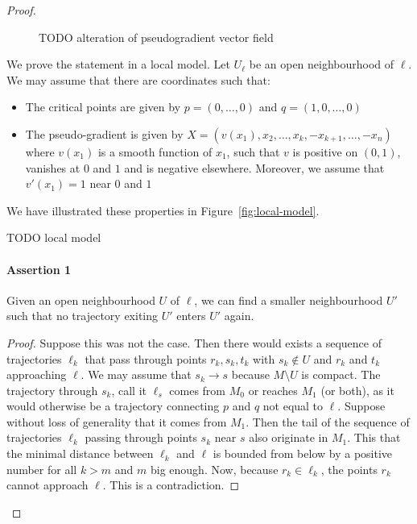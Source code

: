 \begin{proof}
\begin{figure}[H]
    \centering
    \caption{TODO alteration of pseudogradient vector field}
    \label{fig:alteration-of-pseudogradient-vector-field}
\end{figure}

We prove the statement in a local model.
Let $U_\ell$ be an open neighbourhood of $\ell$. 
We may assume that there are coordinates such that:
\begin{itemize}
    \item  The critical points are given by $p = (0, \ldots, 0)$ and $q = (1, 0, \ldots, 0)$
    \item The pseudo-gradient is given by $X = (v(x_1), x_2, \ldots, x_k, -x_{k+1}, \ldots, -x_n)$ where $v(x_1)$ is a smooth function of $x_1$, such that  $v$ is positive on  $(0, 1)$, vanishes at $0$ and $1$ and is negative elsewhere.
        Moreover, we assume that  $v'(x_1) = 1$ near $0$ and $1$
\end{itemize}
We have illustrated these properties in Figure~\ref{fig:local-model}.
\begin{marginfigure}
    \centering
    \caption{TODO local model}
    \label{fig:local-model}
\end{marginfigure}

\renewcommand{\qedsymbol}{\ensuremath{\blacksquare}}

\paragraph{Assertion 1}
Given an open neighbourhood $U$ of  $ \ell$, we can find a smaller neighbourhood $U'$ such that no trajectory exiting $U'$ enters $U'$ again.
\begin{proof}
    Suppose this was not the case.
    Then there would exists a sequence of trajectories $\ell_k$ that pass through points $r_k, s_k, t_k$ with $s_k \not\in U$ and $r_k$ and $t_k$ approaching $\ell$.
    We may assume that $s_k \to s$ because $M \setminus U$ is compact.
    The trajectory through $s_k$, call it $ \ell_s$ comes from  $ M_0$ or reaches $ M_1$ (or both), as it would otherwise be a trajectory connecting $p$ and $q$ not equal to $\ell$.
    Suppose without loss of generality that it comes from $M_1$.
    Then the tail of the sequence of trajectories $\ell_{k}$ passing through points $s_k$ near $s$ also originate in $M_1$.
    This that the minimal distance between $\ell_{k}$ and $\ell$ is bounded from below by a positive number for all $k > m $ and $m$ big enough.
    Now, because $r_k \in \ell_k$, the points $r_k$ cannot approach  $\ell$. This is a contradiction.
\end{proof}


\end{proof}
